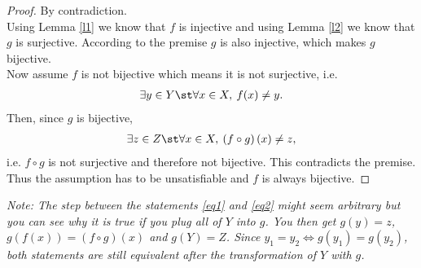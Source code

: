 \documentclass{article}
\begin{document}
\begin{proof}
  By contradiction.\\
  Using Lemma \ref{l1} we know that $f$ is injective and using Lemma \ref{l2} we know that $g$ is surjective.
  According to the premise $g$ is also injective, which makes $g$ bijective.\\
  Now assume $f$ is not bijective which means it is not surjective, i.e.
  \begin{align}
    \label{eq1}
    \exists y \in Y \st \forall x \in X,\: f(x)\not= y.
  \end{align}
  Then, since $g$ is bijective,
  \begin{align}
    \label{eq2}
    \exists z \in Z \st \forall x \in X,\: \left(f\circ g\right)(x)\not= z,
  \end{align}
  i.e. $f\circ g$ is not surjective and therefore not bijective.
  This contradicts the premise.
  Thus the assumption has to be unsatisfiable and $f$ is always bijective.
\end{proof}
\emph{Note: The step between the statements \ref{eq1} and \ref{eq2} might seem arbitrary but you can see why it is true if you plug all of $Y$ into $g$.
You then get $g(y)=z$, $g(f(x))=(f\circ g)(x)$ and $g(Y)=Z$. Since $y_1=y_2\Leftrightarrow g(y_1)=g(y_2)$, both statements are still equivalent after the transformation of $Y$ with $g$.}
\end{document}
